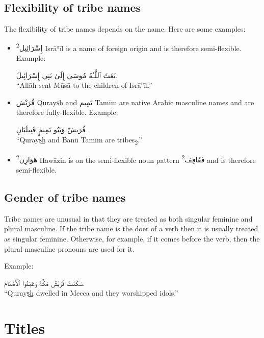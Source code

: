 \documentclass[
  10pt,
]{book}
\begin{document}
\subsection{Flexibility of tribe names}\label{flexibility-of-tribe-names}

The flexibility of tribe names depends on the name. Here are some examples:

\begin{itemize}
\item
  \foreignlanguage{arabic}{إِسْرَائِيل\textsuperscript{2}} Isrāʾīl is a name of foreign origin and is therefore semi-flexible. Example:

  \foreignlanguage{arabic}{بَعَثَ ٱللَّـٰهُ مُوسَىٰ إِلَىٰ بَنِي إِسْرَائِيلَ.}\\
  \enquote{Allāh sent Mūsā to the children of Isrāʾīl.}
\item
  \foreignlanguage{arabic}{قُرَيْش} Qurays͟h and \foreignlanguage{arabic}{تَمِيم} Tamīm are native Arabic masculine names and are therefore fully-flexible. Example:

  \foreignlanguage{arabic}{قُرَيشٌ وَبَنُو تَمِيمٍ قَبِيلَتَانِ.}\\
  \enquote{Qurays͟h and Banū Tamīm are tribes\textsubscript{2}.}
\item
  \foreignlanguage{arabic}{هَوَازِن\textsuperscript{2}} Hawāzin is on the semi-flexible noun pattern \foreignlanguage{arabic}{فَفَافِف\textsuperscript{2}} and is therefore semi-flexible.
\end{itemize}

\subsection{Gender of tribe names}\label{gender-of-tribe-names}

Tribe names are unusual in that they are treated as both singular feminine and plural masculine.
If the tribe name is the doer of a verb then it is usually treated as singular feminine.
Otherwise, for example, if it comes before the verb, then the plural masculine pronouns are used for it.

Example:

\foreignlanguage{arabic}{سَکَنَتْ قُرَيْشٌ مَکَّةَ وَعَبَدُوا ٱلْأَصْنَامَ.}\\
\enquote{Qurays͟h dwelled in Mecca and they worshipped idols.}

\section{Titles}\label{titles}
\end{document}
